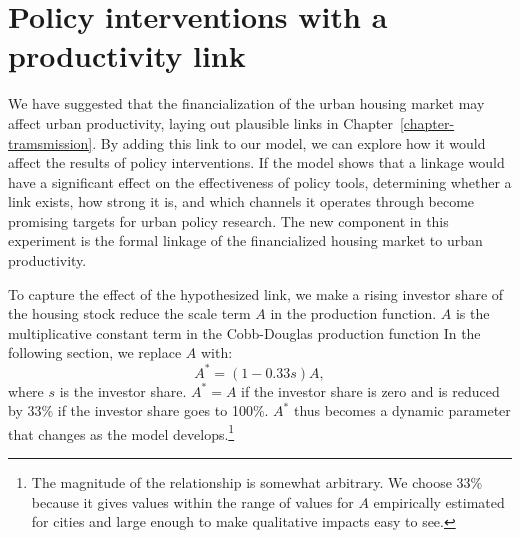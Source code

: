\section{Policy interventions with a productivity link}

We have suggested that the financialization of the urban housing market may affect urban productivity, laying out plausible links in Chapter~\ref{chapter-tramsmission}. %
By adding this link to our model, we can explore how it would affect the results of policy interventions. If the model shows that a linkage would have a significant effect on the effectiveness of policy tools, determining whether a link exists, how strong it is, %
and which channels it operates through become promising targets for urban policy research. 
The new component in this experiment  %
is the formal linkage of the financialized housing market to urban productivity.

To capture the effect of the hypothesized link, we %
make a rising investor share of the housing stock reduce the scale term $A$ in the production function. $A$ is the multiplicative constant term in the Cobb-Douglas production function In the following section, we replace $A$ with:   
\[A^*= (1-0.33s)A,\]
where $s$ is the investor share. $A^*= A$ if the investor share is zero and is reduced by 33\% if the investor share goes to 100\%. $A^*$ thus becomes a dynamic parameter that changes as the model develops.\footnote{The magnitude of the relationship is somewhat arbitrary. %
We choose 33\% because it gives values within the range of values for $A$ empirically estimated for cities and large enough to make qualitative impacts easy to see. %
} 



